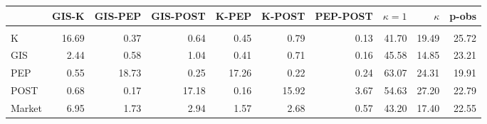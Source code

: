 \begin{tabular}{lrrrrrrrrr}
\toprule
{} &  GIS-K &  GIS-PEP &  GIS-POST &  K-PEP &  K-POST &  PEP-POST &  $\kappa=1$ &  $\kappa$ &    p-obs \\
\midrule
       &        &          &           &        &         &           &             &                 &                         \\
K      &  16.69 &     0.37 &      0.64 &   0.45 &    0.79 &      0.13 &       41.70 &           19.49 &             25.72 \\
GIS    &   2.44 &     0.58 &      1.04 &   0.41 &    0.71 &      0.16 &       45.58 &           14.85 &             23.21 \\
PEP    &   0.55 &    18.73 &      0.25 &  17.26 &    0.22 &      0.24 &       63.07 &           24.31 &             19.91 \\
POST   &   0.68 &     0.17 &     17.18 &   0.16 &   15.92 &      3.67 &       54.63 &           27.20 &            22.79 \\
Market &   6.95 &     1.73 &      2.94 &   1.57 &    2.68 &      0.57 &       43.20 &           17.40 &             22.55 \\
\bottomrule
\end{tabular}
